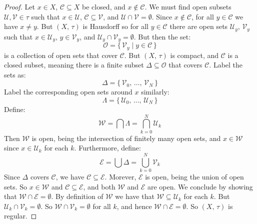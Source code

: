 \documentclass{article}
\theoremstyle{plain}
\theoremstyle{normal}
\begin{document}
        \begin{proof}
            Let $x\in{X}$, $\mathcal{C}\subseteq{X}$ be closed, and
            $x\notin\mathcal{C}$. We must find open subsets
            $\mathcal{U},\mathcal{V}\in\tau$ such that $x\in\mathcal{U}$,
            $\mathcal{C}\subseteq\mathcal{V}$, and
            $\mathcal{U}\cap\mathcal{V}=\emptyset$. Since $x\notin\mathcal{C}$,
            for all $y\in\mathcal{C}$ we have $x\ne{y}$. But $(X,\,\tau)$ is
            Hausdorff so for all $y\in\mathcal{C}$ there are open sets
            $\mathcal{U}_{y},\,\mathcal{V}_{y}$ such that $x\in\mathcal{U}_{y}$,
            $y\in\mathcal{V}_{y}$, and
            $\mathcal{U}_{y}\cap\mathcal{V}_{y}=\emptyset$. But then the
            set:
            \begin{equation}
                \mathcal{O}=\{\,\mathcal{V}_{y}\;|\;y\in\mathcal{C}\,\}
            \end{equation}
            is a collection of open sets that cover $\mathcal{C}$. But
            $(X,\,\tau)$ is compact, and $\mathcal{C}$ is a closed subset,
            meaning there is a finite subset $\Delta\subseteq\mathcal{O}$ that
            covers $\mathcal{C}$. Label the sets as:
            \begin{equation}
                \Delta=\{\,\mathcal{V}_{0},\,\dots,\,\mathcal{V}_{N}\,\}
            \end{equation}
            Label the corresponding open sets around $x$ similarly:
            \begin{equation}
                \Lambda=\{\,\mathcal{U}_{0},\,\dots,\,\mathcal{U}_{N}\,\}
            \end{equation}
            Define:
            \begin{equation}
                \mathcal{W}=\bigcap\Lambda=\bigcap_{k=0}^{N}\mathcal{U}_{k}
            \end{equation}
            Then $\mathcal{W}$ is open, being the intersection of finitely
            many open sets, and $x\in\mathcal{W}$ since
            $x\in\mathcal{U}_{k}$ for each $k$. Furthermore, define:
            \begin{equation}
                \mathcal{E}=\bigcup\Delta=\bigcup_{k=0}^{N}\mathcal{V}_{k}
            \end{equation}
            Since $\Delta$ covers $\mathcal{C}$, we have
            $\mathcal{C}\subseteq\mathcal{E}$. Morever, $\mathcal{E}$ is open,
            being the union of open sets. So $x\in\mathcal{W}$ and
            $\mathcal{C}\subseteq\mathcal{E}$, and both $\mathcal{W}$ and
            $\mathcal{E}$ are open. We conclude by showing that
            $\mathcal{W}\cap\mathcal{E}=\emptyset$.
            By definition of $\mathcal{W}$ we have that
            $\mathcal{W}\subseteq\mathcal{U}_{k}$ for each $k$.
            But $\mathcal{U}_{k}\cap\mathcal{V}_{k}=\emptyset$. So
            $\mathcal{W}\cap\mathcal{V}_{k}=\emptyset$ for all $k$, and hence
            $\mathcal{W}\cap\mathcal{E}=\emptyset$. So $(X,\,\tau)$ is regular.
        \end{proof}
\end{document}
